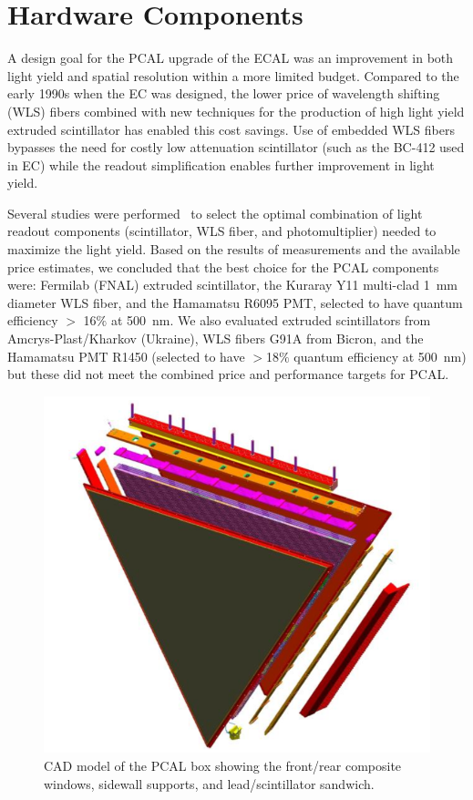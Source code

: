 \section{Hardware Components}
\label{HW}

A design goal for the PCAL upgrade of the ECAL was an improvement in both light yield and spatial resolution
within a more limited budget. Compared to the early 1990s when the EC was designed, the lower price of
wavelength shifting (WLS) fibers combined with new techniques for the production of high light yield extruded
scintillator has enabled this cost savings. Use of embedded WLS fibers bypasses the need for costly low
attenuation scintillator (such as the BC-412 used in EC) while the readout simplification enables further
improvement in light yield.

Several studies were performed~\cite{2007002,2007007,2009018} to select the optimal combination of light
readout components (scintillator, WLS fiber, and photomultiplier) needed to maximize the light yield. Based on
the results of measurements and the available price estimates, we concluded that the best choice for the PCAL
components were: Fermilab (FNAL) extruded scintillator, the Kuraray Y11 multi-clad 1~mm diameter WLS fiber,
and the Hamamatsu R6095 PMT, selected to have quantum efficiency $>$ 16$\%$ at 500~nm. We also evaluated
extruded scintillators from Amcrys-Plast/Kharkov (Ukraine), WLS fibers G91A from Bicron, and the Hamamatsu
PMT R1450 (selected to have $>$18$\%$ quantum efficiency at 500~nm) but these did not meet the combined
price and performance targets for PCAL. 

\begin{figure}[hbt]
\centering
\includegraphics[width=0.95\columnwidth,keepaspectratio]{img/S4_0.png}
\caption{CAD model of the PCAL box showing the front/rear composite windows, sidewall supports, and
  lead/scintillator sandwich.}
\label{fig:S4_0}
\end{figure}


